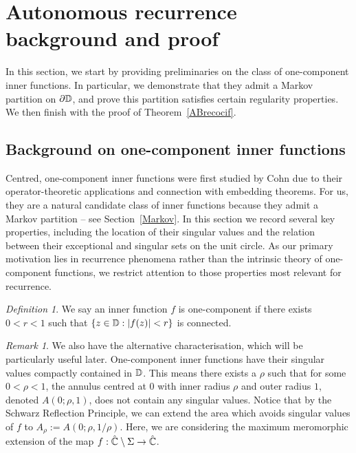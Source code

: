 \documentclass[11pt,reqno]{amsart}
\newcommand{\C}{{\Bbb C}}
\newcommand{\D}{{\Bbb D}}
\newcommand{\0}{\mathbf{0}}
\newtheorem{definition}{Definition}
\theoremstyle{remark}
\newtheorem{remark}{{Remark}}
\numberwithin{equation}{section}
\newtheorem{definition}[theorem]{Definition}
\theoremstyle{remark}
\newtheorem*{remark}{Remark}
\numberwithin{equation}{section}
\begin{document}
\medskip





\section{Autonomous recurrence background and proof}\label{autrecres}
In this section, we start by providing preliminaries on the class of one-component inner functions. In particular, we demonstrate that they admit a Markov partition on $\partial \D$, and prove this partition satisfies certain regularity properties. We then finish with the proof of Theorem~\ref{ABrecocif}.
\subsection{Background on one-component inner functions}\label{backocif]}
Centred, one-component inner functions were first studied by Cohn \cite{cohn} due to their operator-theoretic applications and connection with embedding theorems. For us, they are a natural candidate class of inner functions because they admit a Markov partition -- see Section~\ref{Markov}. In this section we record several key properties, including the location of their singular values and the relation between their exceptional and singular sets on the unit circle. As our primary motivation lies in recurrence phenomena rather than the intrinsic theory of one-component functions, we restrict attention to those properties most relevant for recurrence.
\begin{definition}\label{defocf}
    We say an inner function $f$ is one-component if there exists $0<r<1$ such that $\{z \in \D: |f(z)| < r\}$ is connected.
\end{definition}
\begin{remark}\label{altdefocf}
We also have the alternative characterisation, which will be particularly useful later. One-component inner functions have their singular values compactly contained in $\D$. This means there exists a $\rho$ such that for some $0<\rho<1$, the annulus centred at $0$ with inner radius $\rho$ and outer radius $1$, denoted $A(0;\rho,1)$, does not contain any singular values. Notice that by the Schwarz Reflection Principle, we can extend the area which avoids singular values of $f$ to $A_\rho:=A(0;\rho,1/\rho)$. Here, we are considering the maximum meromorphic extension of the map $f: \hat{\C}\setminus \Sigma \to \hat{\C}$.
\end{remark} 
\end{document}
